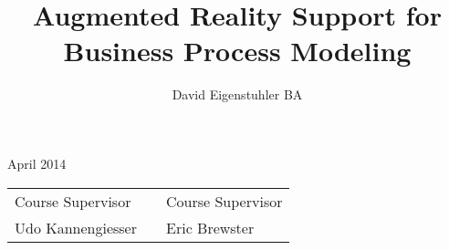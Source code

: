 \documentclass[12pt]{llncs} %
\begin{document}
 
%
\frontmatter          %
%
\pagestyle{headings}  %
%

\author{David Eigenstuhler BA}
\title{Augmented Reality Support for Business Process Modeling}
\maketitle

\begin{flushright}\noindent
April 2014 
\end{flushright}
\vspace{1cm}

\begin{tabular}{p{4cm}p{4cm}p{4cm}}
Course Supervisor & & Course Supervisor \tabularnewline 
Udo Kannengiesser & & Eric Brewster \tabularnewline 
\end{tabular} 


\end{document}

